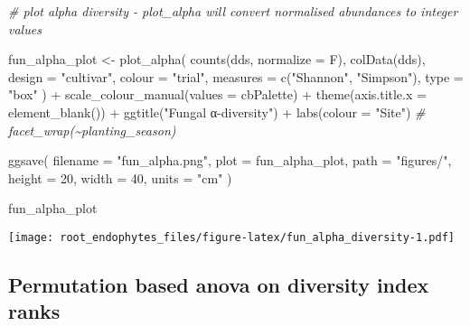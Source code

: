\documentclass[
]{article}
\newenvironment{Shaded}{\begin{snugshade}}{\end{snugshade}}
\newcommand{\AttributeTok}[1]{\textcolor[rgb]{0.77,0.63,0.00}{#1}}
\newcommand{\CommentTok}[1]{\textcolor[rgb]{0.56,0.35,0.01}{\textit{#1}}}
\newcommand{\DecValTok}[1]{\textcolor[rgb]{0.00,0.00,0.81}{#1}}
\newcommand{\FunctionTok}[1]{\textcolor[rgb]{0.00,0.00,0.00}{#1}}
\newcommand{\NormalTok}[1]{#1}
\newcommand{\OtherTok}[1]{\textcolor[rgb]{0.56,0.35,0.01}{#1}}
\newcommand{\SpecialCharTok}[1]{\textcolor[rgb]{0.00,0.00,0.00}{#1}}
\newcommand{\StringTok}[1]{\textcolor[rgb]{0.31,0.60,0.02}{#1}}
\begin{document}
\begin{Shaded}
\begin{Highlighting}[]
\CommentTok{\# plot alpha diversity {-} plot\_alpha will convert normalised abundances to integer values}

\NormalTok{fun\_alpha\_plot }\OtherTok{\textless{}{-}} \FunctionTok{plot\_alpha}\NormalTok{(}
  \FunctionTok{counts}\NormalTok{(dds, }\AttributeTok{normalize =}\NormalTok{ F), }\FunctionTok{colData}\NormalTok{(dds),}
  \AttributeTok{design =} \StringTok{"cultivar"}\NormalTok{, }\AttributeTok{colour =} \StringTok{"trial"}\NormalTok{,}
  \AttributeTok{measures =} \FunctionTok{c}\NormalTok{(}\StringTok{"Shannon"}\NormalTok{, }\StringTok{"Simpson"}\NormalTok{),}
  \AttributeTok{type =} \StringTok{"box"}
\NormalTok{) }\SpecialCharTok{+} \FunctionTok{scale\_colour\_manual}\NormalTok{(}\AttributeTok{values =}\NormalTok{ cbPalette) }\SpecialCharTok{+} 
  \FunctionTok{theme}\NormalTok{(}\AttributeTok{axis.title.x =} \FunctionTok{element\_blank}\NormalTok{()) }\SpecialCharTok{+}
  \FunctionTok{ggtitle}\NormalTok{(}\StringTok{"Fungal α{-}diversity"}\NormalTok{) }\SpecialCharTok{+} 
  \FunctionTok{labs}\NormalTok{(}\AttributeTok{colour =} \StringTok{"Site"}\NormalTok{)}
  \CommentTok{\# facet\_wrap(\textasciitilde{}planting\_season)}

\FunctionTok{ggsave}\NormalTok{(}
  \AttributeTok{filename =} \StringTok{"fun\_alpha.png"}\NormalTok{, }\AttributeTok{plot =}\NormalTok{ fun\_alpha\_plot, }\AttributeTok{path =} \StringTok{"figures/"}\NormalTok{, }
  \AttributeTok{height =} \DecValTok{20}\NormalTok{, }\AttributeTok{width =} \DecValTok{40}\NormalTok{, }\AttributeTok{units =} \StringTok{"cm"}
\NormalTok{)}

\NormalTok{fun\_alpha\_plot}
\end{Highlighting}
\end{Shaded}

\texttt{[image: root\_endophytes\_files/figure-latex/fun\_alpha\_diversity-1.pdf]}

\hypertarget{permutation-based-anova-on-diversity-index-ranks}{%
\subsection{Permutation based anova on diversity index
ranks}\label{permutation-based-anova-on-diversity-index-ranks}}
\end{document}
